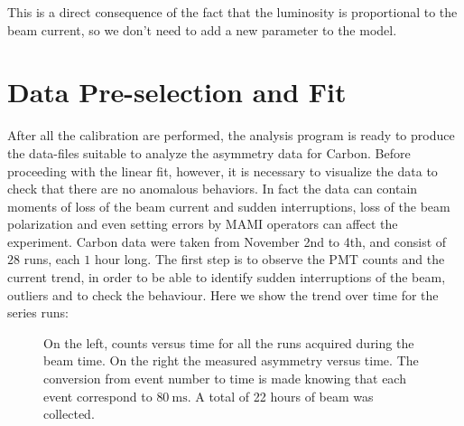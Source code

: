 This is a direct consequence of the fact that the luminosity is proportional to the beam current, so we don't need to add a new parameter to the model.

\section{Data Pre-selection and Fit}

After all the calibration are performed, the analysis program is ready to produce the data-files suitable to analyze the asymmetry data for Carbon. Before proceeding with the linear fit, however, it is necessary to visualize the data to check that there are no anomalous behaviors. In fact the data can contain moments of loss of the beam current and sudden interruptions, loss of the beam polarization and even setting errors by MAMI operators can affect the experiment. Carbon data were taken from November 2nd to 4th, and consist of $28$ runs, each $1$ hour long.
The first step is to observe the PMT counts and the current trend, in order to be able to identify sudden interruptions of the beam, outliers and to check the behaviour. Here we show the trend over time for the series runs: 

\begin{figure}[hbtp]
\centering
{}
\caption{On the left, counts versus time for all the runs acquired during the beam time. On the right the measured asymmetry versus time. The conversion from event number to time is made knowing that each event correspond to $\SI{80}{\milli \second}$. A total of 22 hours of beam was collected.}
\label{fig::CountTrend}
\end{figure}

